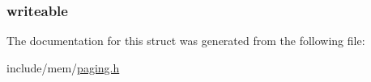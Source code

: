 \subsubsection[{\texorpdfstring{writeable}{writeable}}]{ writeable}\hypertarget{structpage__entry_a421725c39c0745b022f36ab85b6cf3ce}{}\label{structpage__entry_a421725c39c0745b022f36ab85b6cf3ce}


The documentation for this struct was generated from the following file\+:\begin{DoxyCompactItemize}
\item 
include/mem/\hyperlink{paging_8h}{paging.\+h}\end{DoxyCompactItemize}
